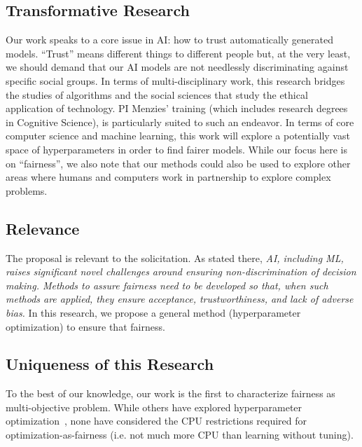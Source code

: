 \subsection{Transformative Research}\label{transformative}
 Our work speaks to a core issue in AI: how to trust automatically generated models.   ``Trust''  means  different  things  to  different  people  but,  at  the  very  least,  we  should demand that our AI models are not needlessly discriminating against specific social groups.
In terms of multi-disciplinary work, this research bridges the studies of
algorithms and the social sciences that study the ethical
application of technology. PI Menzies' training
(which
includes research degrees  in Cognitive Science),
is particularly suited to such
an endeavor. 
In terms of core computer science and machine learning, 
this work will
explore a potentially vast space of hyperparameters  
in order to find fairer models. While our focus here is on ``fairness'', we also note that our methods could also be used
to explore other areas where humans and computers work in partnership to explore complex problems. 
 
\subsection{Relevance  }\label{relevance} 
 
  The proposal is   relevant to the   solicitation. 
 As stated there,
 {\em AI, including ML, raises significant novel challenges around ensuring non-discrimination of decision making.   Methods to assure fairness need to be developed so that, when such methods are applied, they ensure acceptance, trustworthiness, and lack of adverse bias.} In this research, we propose
 a general method (hyperparameter optimization) to ensure that fairness.

\subsection{ Uniqueness of this Research}\label{uniqueness} 

   To the best of our knowledge, our work is the first to characterize fairness as  multi-objective problem.
  While others    have explored hyperparameter optimization~\cite{Mockus1994,hutter2011sequential,bergstra2011algorithms,hutter2010sequential,piche2009model,snoek2012practical,martinez2014bayesopt,kotthoff2017auto,chen2009efficient,lacoste2014sequential,maclaurin2015gradient,feurer2015initializing,bergstra2012random,bartz2010sequential,bergstra2013hyperopt,eggensperger2013towards,thornton2013auto,bergstra2015hyperopt,piche2010model},
  none have considered the    CPU restrictions required for
  optimization-as-fairness (i.e.  
 not much more CPU than learning without tuning).



